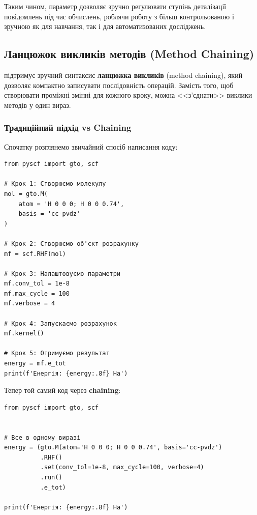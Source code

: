 Таким чином, параметр  дозволяє зручно регулювати ступінь деталізації повідомлень під час обчислень,
роблячи роботу з \PySCF{} більш контрольованою і зручною як для навчання, так і для автоматизованих досліджень.

\subsection{Ланцюжок викликів методів (Method Chaining)}

\PySCF{} підтримує зручний синтаксис \textbf{ланцюжка викликів} (method chaining),
який дозволяє компактно записувати послідовність операцій. Замість того, щоб
створювати проміжні змінні для кожного кроку, можна <<з'єднати>> виклики методів
у один вираз.

\subsubsection{Традиційний підхід vs Chaining}

Спочатку розглянемо звичайний спосіб написання коду:

\begin{verbatim}
from pyscf import gto, scf

# Крок 1: Створюємо молекулу
mol = gto.M(
    atom = 'H 0 0 0; H 0 0 0.74',
    basis = 'cc-pvdz'
)

# Крок 2: Створюємо об'єкт розрахунку
mf = scf.RHF(mol)

# Крок 3: Налаштовуємо параметри
mf.conv_tol = 1e-8
mf.max_cycle = 100
mf.verbose = 4

# Крок 4: Запускаємо розрахунок
mf.kernel()

# Крок 5: Отримуємо результат
energy = mf.e_tot
print(f'Енергія: {energy:.8f} Ha')
\end{verbatim}

Тепер той самий код через \textbf{chaining}:

\begin{verbatim}
from pyscf import gto, scf


# Все в одному виразі
energy = (gto.M(atom='H 0 0 0; H 0 0 0.74', basis='cc-pvdz')
          .RHF()
          .set(conv_tol=1e-8, max_cycle=100, verbose=4)
          .run()
          .e_tot)

print(f'Енергія: {energy:.8f} Ha')
\end{verbatim}


